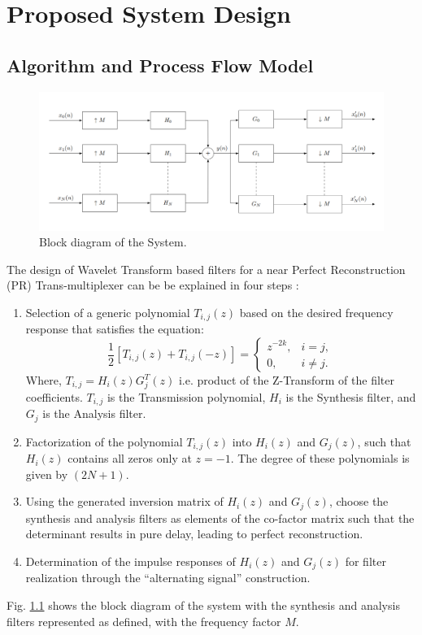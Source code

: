 \chapter{Proposed System Design}
\section{Algorithm and Process Flow Model}

\begin{figure}[htpb]
\centering
\includegraphics[width=5.2in]{system_block.png}
\caption{Block diagram of the System.}
\label{block}
\end{figure}

The design of Wavelet Transform based filters for a near Perfect Reconstruction (PR) Trans-multiplexer can be be explained in four steps \cite{b2} \cite{b5} \cite{b9}:
\begin{enumerate}
    \item Selection of a generic polynomial $T_{i,j}(z)$ based on the desired frequency response that satisfies the equation: 
\[ 
\frac{1}{2}[T_{i,j}(z) + T_{i,j}(-z)] = \left\{
  \begin{array}{lr} 
      z^{-2k}, & i = j, \\
      0, & i \neq j. 
      \end{array}
\right.
\]
Where, $T_{i,j} = H_i(z) G_j^T(z)$ i.e. product of the Z-Transform of the filter coefficients. $T_{i,j}$ is the Transmission polynomial, $H_i$ is the Synthesis filter, and $G_j$ is the Analysis filter.
\item Factorization of the polynomial $T_{i,j}(z)$ into $H_i(z)$ and $G_j(z)$, such that $H_i(z)$ contains all zeros only at $z = -1$. The degree of these polynomials is given by $(2N+1)$.
\item Using the generated inversion matrix of $H_i(z)$ and $G_j(z)$, choose the synthesis and analysis filters as elements of the co-factor matrix such that the determinant results in pure delay, leading to perfect reconstruction. 
\item Determination of the impulse responses of $H_i(z)$ and $G_j(z)$ for filter realization through the ``alternating signal'' construction.
\end{enumerate}
Fig. \ref{block} shows the block diagram of the system with the synthesis and analysis filters represented as defined, with the frequency factor $M$.


